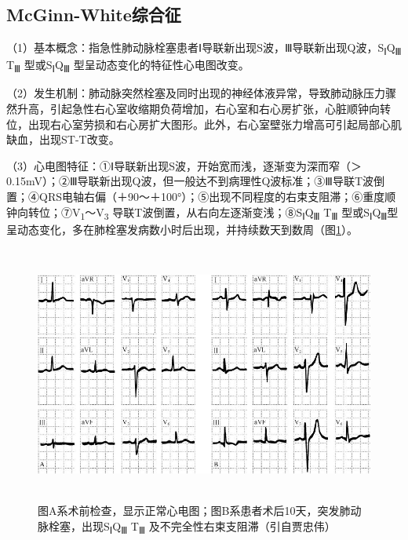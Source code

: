 \subsection{McGinn-White综合征}

（1）基本概念：指急性肺动脉栓塞患者Ⅰ导联新出现S波，Ⅲ导联新出现Q波，S\textsubscript{Ⅰ}Q\textsubscript{Ⅲ} T\textsubscript{Ⅲ} 型或S\textsubscript{Ⅰ}Q\textsubscript{Ⅲ} 型呈动态变化的特征性心电图改变。

（2）发生机制：肺动脉突然栓塞及同时出现的神经体液异常，导致肺动脉压力骤然升高，引起急性右心室收缩期负荷增加，右心室和右心房扩张，心脏顺钟向转位，出现右心室劳损和右心房扩大图形。此外，右心室壁张力增高可引起局部心肌缺血，出现ST-T改变。

（3）心电图特征：①Ⅰ导联新出现S波，开始宽而浅，逐渐变为深而窄（＞0.15mV）；②Ⅲ导联新出现Q波，但一般达不到病理性Q波标准；③Ⅲ导联T波倒置；④QRS电轴右偏（＋90～＋100°）；⑤出现不同程度的右束支阻滞；⑥重度顺钟向转位；⑦V\textsubscript{1}～V\textsubscript{3} 导联T波倒置，从右向左逐渐变浅；⑧S\textsubscript{Ⅰ}Q\textsubscript{Ⅲ} T\textsubscript{Ⅲ} 型或S\textsubscript{Ⅰ}Q\textsubscript{Ⅲ}型呈动态变化，多在肺栓塞发病数小时后出现，并持续数天到数周（图\ref{fig40-19}）。

\begin{figure}[!htbp]
 \centering
 \includegraphics[width=5.58333in,height=3.33333in]{./images/Image00681.jpg}
 \captionsetup{justification=centering}
 \caption{图A系术前检查，显示正常心电图；图B系患者术后10天，突发肺动脉栓塞，出现S\textsubscript{Ⅰ}Q\textsubscript{Ⅲ} T\textsubscript{Ⅲ} 及不完全性右束支阻滞（引自贾忠伟）}
 \label{fig40-19}
  \end{figure} 


\protect\hypertarget{text00047.htmlux5cux23subid578}{}{}

